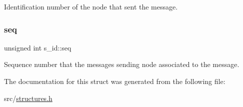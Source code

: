 Identification number of the node that sent the message. 

\mbox{\label{structs__id_aa384054b68c5bfb4ed4a230e6a0e895f}} 
\subsubsection{\texorpdfstring{seq}{seq}}
{\footnotesize\ttfamily unsigned int s\+\_\+id\+::seq}



Sequence number that the message\textquotesingle{}s sending node associated to the message. 



The documentation for this struct was generated from the following file\+:\begin{DoxyCompactItemize}
\item 
src/\hyperlink{structures_8h}{structures.\+h}\end{DoxyCompactItemize}
